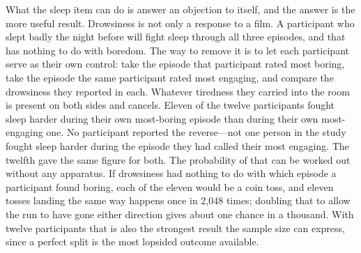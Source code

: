 What the sleep item can do is answer an objection to itself, and the answer is the more useful
result. Drowsiness is not only a response to a film. A participant who slept badly the night
before will fight sleep through all three episodes, and that has nothing to do with boredom. The
way to remove it is to let each participant serve as their own control: take the episode that
participant rated most boring, take the episode the same participant rated most engaging, and
compare the drowsiness they reported in each. Whatever tiredness they carried into the room is
present on both sides and cancels. Eleven of the twelve participants fought sleep harder during
their own most-boring episode than during their own most-engaging one. No participant reported
the reverse---not one person in the study fought sleep harder during the episode they had called
their most engaging. The twelfth gave the same figure for both. The probability of that can be worked out without
any apparatus. If drowsiness had nothing to do with which episode a participant found boring,
each of the eleven would be a coin toss, and eleven tosses landing the same way happens once in
2,048 times; doubling that to allow the run to have gone either direction gives about one chance
in a thousand. With twelve participants that is also the strongest result the sample size can
express, since a perfect split is the most lopsided outcome available.


